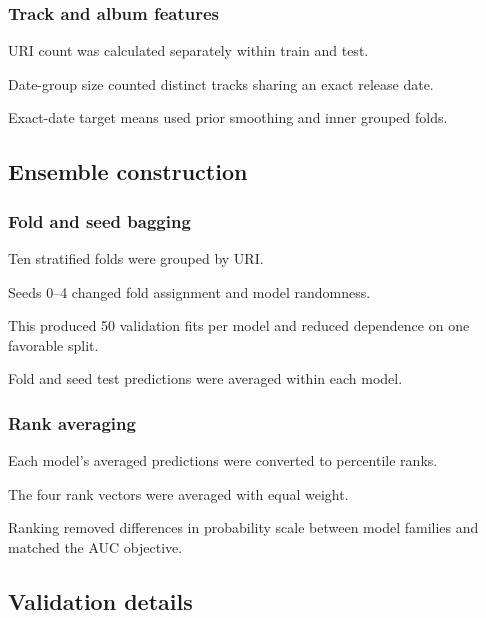 \documentclass{article}
\begin{document}
\subsubsection{Track and album features}
\begin{compactitem}
  \item URI count was calculated separately within train and test.
  \item Date-group size counted distinct tracks sharing an exact release date.
  \item Exact-date target means used prior smoothing and inner grouped folds.
\end{compactitem}

\subsection{Ensemble construction}
\label{app:ensemble}
\subsubsection{Fold and seed bagging}
\begin{compactitem}
  \item Ten stratified folds were grouped by URI.
  \item Seeds 0--4 changed fold assignment and model randomness.
  \item This produced 50 validation fits per model and reduced dependence on
  one favorable split.
  \item Fold and seed test predictions were averaged within each model.
\end{compactitem}

\subsubsection{Rank averaging}
\begin{compactitem}
  \item Each model's averaged predictions were converted to percentile ranks.
  \item The four rank vectors were averaged with equal weight.
  \item Ranking removed differences in probability scale between model
  families and matched the AUC objective.
\end{compactitem}

\subsection{Validation details}
\label{app:validation}
\end{document}
